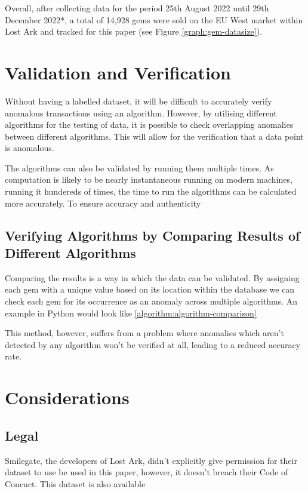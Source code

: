 \documentclass[journal]{IEEEtran}
\begin{document}
Overall, after collecting data for the period 25th August 2022 until 29th December 2022*, a total of 14,928 gems were sold on the EU West market within Lost Ark and tracked for this paper (see Figure \ref{graph:gem-datasize}).

\section{Validation and Verification}
\noindent Without having a labelled dataset, it will be difficult to accurately verify anomalous transactions using an algorithm. However, by utilising different algorithms for the testing of data, it is possible to check overlapping anomalies between different algorithms. This will allow for the verification that a data point is anomalous.

The algorithms can also be validated by running them multiple times. As computation is likely to be nearly instantaneous running on modern machines, running it hundereds of times, the time to run the algorithms can be calculated more accurately. To ensure accuracy and authenticity

\subsection{Verifying Algorithms by Comparing Results of Different Algorithms}
\noindent Comparing the results is a way in which the data can be validated. By assigning each gem with a unique value based on its location within the database we can check each gem for its occurrence as an anomaly across multiple algorithms. An example in Python would look like \ref{algorithm:algorithm-comparison}

This method, however, suffers from a problem where anomalies which aren't detected by any algorithm won't be verified at all, leading to a reduced accuracy rate.

\section{Considerations}
\subsection{Legal}
\noindent Smilegate, the developers of Lost Ark, didn't explicitly give permission for their dataset to use be used in this paper, however, it doesn't breach their Code of Concuct\cite{AmazonGamesCOC}. This dataset is also available
\end{document}
